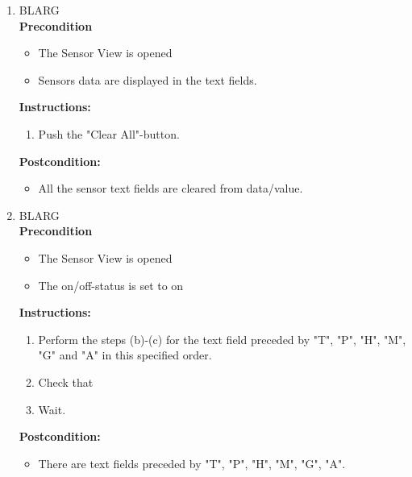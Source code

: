 \documentclass[a4paper]{article}
\newlength{\testlabellength}
\newenvironment{testlist}{\begin{enumerate}[label=\bfseries Instruction \thesubsection.\arabic* , labelindent=0pt, labelwidth=\testlabellength , leftmargin=2cm]}{\end{enumerate}}
\newenvironment{precondition}{
{\color{white}BLARG}\\ 
\textbf{Precondition}
\begin{itemize}[labelindent=0cm, labelwidth=2cm , leftmargin=1cm]
}
{\end{itemize}}
\newenvironment{instruction}{
\textbf{Instructions:}
\begin{enumerate}[label=\bfseries  \arabic*., labelindent=0cm, labelwidth=2cm , leftmargin=1cm]
}
{\end{enumerate}}
\newenvironment{postcondition}{
\textbf{Postcondition:}
\begin{itemize}[labelindent=0cm, labelwidth=2cm , leftmargin=1cm]
}
{\end{itemize}}
\begin{document}
\begin{appendices}
\begin{testlist}
	\item
		\begin{precondition}
			\item The Sensor View is opened
			\item Sensors data are displayed in the text fields.
		\end{precondition}
		\begin{instruction}
			\item Push the "Clear All"-button.
		\end{instruction}
		\begin{postcondition}
			\item All the sensor text fields are cleared from data/value.
		\end{postcondition}

	\item
		\begin{precondition}
			\item The Sensor View is opened
			\item The on/off-status is set to on
		\end{precondition}
		\begin{instruction}
			\item Perform the steps (b)-(c) for the text field preceded by "T", "P", "H", "M", "G" and "A" in this specified order.
    		\item Check that 
	    	\item Wait.
    	\end{instruction}
    	\begin{postcondition}
    		\item There are text fields preceded by "T", "P", "H", "M", "G", "A".
    	\end{postcondition}


\end{testlist}
\end{appendices}
\end{document}
